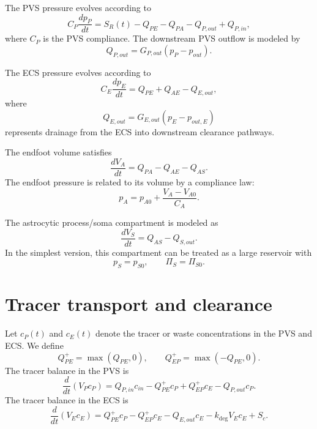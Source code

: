 \documentclass{article}
\begin{document}
The PVS pressure evolves according to
\begin{equation}
    C_P \frac{dp_P}{dt}
    =
    S_R(t)
    -
    Q_{PE}
    -
    Q_{PA}
    -
    Q_{P,out}
    +
    Q_{P,in},
\end{equation}
where \(C_P\) is the PVS compliance. The downstream PVS outflow is modeled by
\begin{equation}
    Q_{P,out}
    =
    G_{P,out}(p_P-p_{out}).
\end{equation}

The ECS pressure evolves according to
\begin{equation}
    C_E \frac{dp_E}{dt}
    =
    Q_{PE}
    +
    Q_{AE}
    -
    Q_{E,out},
\end{equation}
where
\begin{equation}
    Q_{E,out}
    =
    G_{E,out}(p_E-p_{out,E})
\end{equation}
represents drainage from the ECS into downstream clearance pathways.

The endfoot volume satisfies
\begin{equation}
    \frac{dV_A}{dt}
    =
    Q_{PA}
    -
    Q_{AE}
    -
    Q_{AS}.
\end{equation}
The endfoot pressure is related to its volume by a compliance law:
\begin{equation}
    p_A
    =
    p_{A0}
    +
    \frac{V_A-V_{A0}}{C_A}.
\end{equation}

The astrocytic process/soma compartment is modeled as
\begin{equation}
    \frac{dV_S}{dt}
    =
    Q_{AS}
    -
    Q_{S,out}.
\end{equation}
In the simplest version, this compartment can be treated as a large reservoir with
\[
    p_S=p_{S0},
    \qquad
    \Pi_S=\Pi_{S0}.
\]

\section{Tracer transport and clearance}

Let \(c_P(t)\) and \(c_E(t)\) denote the tracer or waste concentrations in the PVS and ECS. We define
\[
    Q_{PE}^{+}=\max(Q_{PE},0),
    \qquad
    Q_{EP}^{+}=\max(-Q_{PE},0).
\]
The tracer balance in the PVS is
\begin{equation}
    \frac{d}{dt}(V_P c_P)
    =
    Q_{P,in}c_{in}
    -
    Q_{PE}^{+}c_P
    +
    Q_{EP}^{+}c_E
    -
    Q_{P,out}c_P.
\end{equation}
The tracer balance in the ECS is
\begin{equation}
    \frac{d}{dt}(V_E c_E)
    =
    Q_{PE}^{+}c_P
    -
    Q_{EP}^{+}c_E
    -
    Q_{E,out}c_E
    -
    k_{\mathrm{deg}}V_Ec_E
    +
    S_c.
\end{equation}
\end{document}
